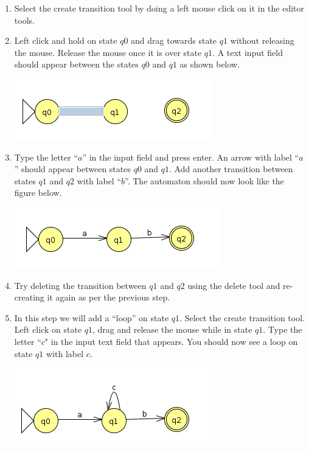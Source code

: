 \documentclass[11pt]{article}
\begin{document}
 \begin{enumerate}
   \item Select the create transition tool by doing a left mouse click on it in the editor tools.
   \item Left click and hold on state $q0$ and drag towards state $q1$ without releasing the mouse. Release the mouse once it is over state $q1$. A text input field should appear between the states $q0$ and $q1$ as shown below.
   \begin{center}
  	\vspace{-0.3cm}\hspace{2em}
  	\includegraphics[width=0.27\linewidth]{img/fa_a_input.png}
  	\label{fig:input}
   \end{center}

   \item Type the letter ``$a$'' in the input field and press enter. An arrow with label ``$a$'' should appear between states $q0$ and $q1$. Add another transition between states $q1$ and $q2$ with label ``$b$''. The automaton should now look like the figure below.
   \begin{center}
  	\vspace{-0.3cm}\hspace{2em}
  	\includegraphics[width=0.28\linewidth]{img/fa_trc.png}
  	\label{fig:input}
   \end{center}

   \item Try deleting the transition between $q1$ and $q2$ using the delete tool and re-creating it again as per the previous step.
   \item In this step we will add a ``loop'' on state $q1$. Select the create transition tool. Left click on state $q1$, drag and release the mouse while in state $q1$. Type the letter ``$c$" in the input text field that appears. You should now see a loop on state $q1$ with label $c$.
   \begin{center}
  \vspace{-0.3cm}\hspace{2em}
  \includegraphics[width=0.28\linewidth]{img/fa_loop.png}
  \label{fig:input}
   \end{center}
 \end{enumerate}
\end{document}
